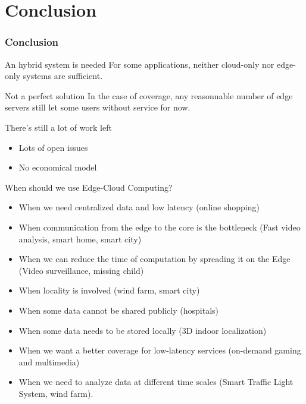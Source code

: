 \documentclass[utf8,xcolor=table, page number]{earlywinter}
\begin{document}
\section{Conclusion}
\begin{frame}
  \frametitle{Conclusion}

  \begin{block}{An hybrid system is needed}
    For some applications, neither cloud-only nor edge-only systems are sufficient.
  \end{block}
  
  \begin{alertblock}{Not a perfect solution}
    In the case of coverage, any reasonnable number of edge servers still let some users without service for now.
  \end{alertblock}
  
  \begin{alertblock}{There's still a lot of work left}
    \begin{itemize}
      \item Lots of open issues
      \item No economical model
    \end{itemize}
  \end{alertblock}

  
\end{frame}


\begin{frame}{When should we use Edge-Cloud Computing?}
\begin{itemize}
\item When we need centralized data and low latency (online shopping)
\item When communication from the edge to the core is the bottleneck (Fast video analysis, smart home, smart city)
\item When we can reduce the time of computation by spreading it on the Edge (Video surveillance, missing child)
\item When locality is involved (wind farm, smart city)
\item When some data cannot be shared publicly (hospitals)
\item When some data needs to be stored locally (3D indoor localization)
\item When we want a better coverage for low-latency services (on-demand gaming and multimedia)
\item When we need to analyze data at different time scales (Smart Traffic Light System, wind farm). 
\end{itemize}
\end{frame}
\end{document}
